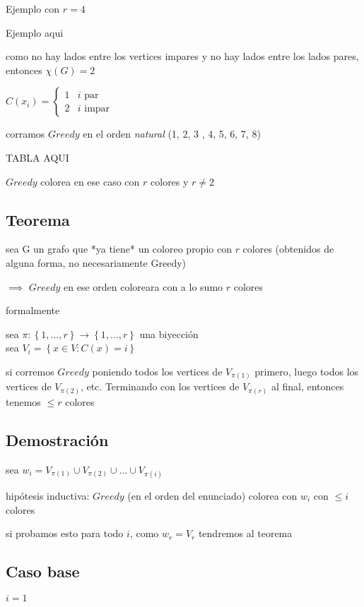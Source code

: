 \documentclass[12pt]{article}
\begin{document}
Ejemplo con $r = 4$

Ejemplo aqui

como no hay lados entre los vertices impares y no hay lados entre los lados pares, entonces $\chi(G) = 2$

\(C(x_i) =
\begin{cases}
1 & i \text{ par} \\
2 & i \text{ impar}
\end{cases} \)

corramos $Greedy$ en el orden \textit{natural} (1, 2, 3 , 4, 5, 6, 7, 8)

TABLA AQUI

$Greedy$ colorea en ese caso con $r$ colores y $r \ne 2$

\begin{center}
\subsection*{Teorema}

sea G un grafo que *ya tiene* un coloreo propio con $r$ colores (obtenidos de alguna forma, no necesariamente Greedy)

$\implies$ $Greedy$ en ese orden coloreara con a lo sumo $r$ colores

\end{center}

formalmente

sea $\pi : \left\{1, ..., r\right\} \rightarrow \left\{1, ..., r\right\}$ una biyección \\
sea $V_i = \left\{x \in V : C(x) = i\right\}$

si corremos $Greedy$ poniendo todos los vertices de $V_{\pi(1)}$ primero, luego todos los vertices de $V_{\pi(2)}$, etc. Terminando con los vertices de $V_{\pi(r)}$ al final, entonces tenemos $\leq r$ colores

\subsection*{Demostración}

sea $w_i = V_{\pi(1)} \cup V_{\pi(2)} \cup ... \cup V_{\pi(i)}$

hipótesis inductiva: $Greedy$ (en el orden del enunciado) colorea con $w_i$ con $\leq i$ colores

si probamos esto para todo $i$, como $w_r = V_r$ tendremos al teorema

\subsection*{Caso base}
$i = 1$
\end{document}
